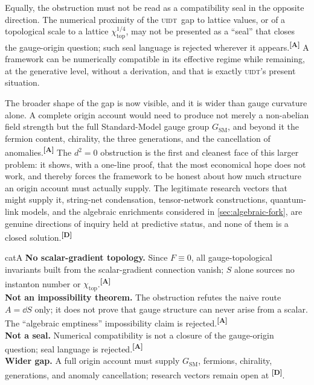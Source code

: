 \documentclass[12pt,a4paper,twoside]{article}
\theoremstyle{plain}
\theoremstyle{definition}
\theoremstyle{remark}
\newcommand{\UIDT}{\textsc{uidt}}
\newcommand{\catmark}[1]{\textsuperscript{\textsf{\textbf{[#1]}}}}
\begin{document}
Equally, the obstruction must not be read as a compatibility seal in the opposite direction. The numerical proximity of the \UIDT\ gap to lattice values, or of a topological scale to a lattice $\chi_{\mathrm{top}}^{1/4}$, may not be presented as a ``seal'' that closes the gauge-origin question; such seal language is rejected wherever it appears.\catmark{A} A framework can be numerically compatible in its effective regime while remaining, at the generative level, without a derivation, and that is exactly \UIDT's present situation.

The broader shape of the gap is now visible, and it is wider than gauge curvature alone. A complete origin account would need to produce not merely a non-abelian field strength but the full Standard-Model gauge group $G_{\mathrm{SM}}$, and beyond it the fermion content, chirality, the three generations, and the cancellation of anomalies.\catmark{A} The $d^2 = 0$ obstruction is the first and cleanest face of this larger problem: it shows, with a one-line proof, that the most economical hope does not work, and thereby forces the framework to be honest about how much structure an origin account must actually supply. The legitimate research vectors that might supply it, string-net condensation, tensor-network constructions, quantum-link models, and the algebraic enrichments considered in \cref{sec:algebraic-fork}, are genuine directions of inquiry held at predictive status, and none of them is a closed solution.\catmark{D}

\begin{evidencebox}{catA}
\textbf{No scalar-gradient topology.} Since $F \equiv 0$, all gauge-topological invariants built from the scalar-gradient connection vanish; $S$ alone sources no
instanton number or $\chi_{\mathrm{top}}$.\catmark{A}\\[0.3em]
\textbf{Not an impossibility theorem.} The obstruction refutes the naive route $A=\dd S$ only; it does not prove that gauge structure can never arise from a scalar. The ``algebraic emptiness'' impossibility claim is
rejected.\catmark{A}\\[0.3em]
\textbf{Not a seal.} Numerical compatibility is not a closure of the
gauge-origin question; seal language is rejected.\catmark{A}\\[0.3em]
\textbf{Wider gap.} A full origin account must supply $G_{\mathrm{SM}}$, fermions, chirality, generations, and anomaly cancellation; research vectors remain open at \catmark{D}.
\end{evidencebox}
\end{document}
